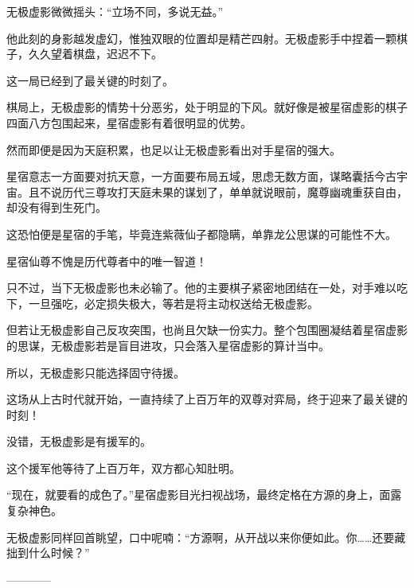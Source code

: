 \begin{this_body}
无极虚影微微摇头：“立场不同，多说无益。”

他此刻的身影越发虚幻，惟独双眼的位置却是精芒四射。无极虚影手中捏着一颗棋子，久久望着棋盘，迟迟不下。

这一局已经到了最关键的时刻了。

棋局上，无极虚影的情势十分恶劣，处于明显的下风。就好像是被星宿虚影的棋子四面八方包围起来，星宿虚影有着很明显的优势。

然而即便是因为天庭积累，也足以让无极虚影看出对手星宿的强大。

星宿意志一方面要对抗天意，一方面要布局五域，思虑无数方面，谋略囊括今古宇宙。且不说历代三尊攻打天庭未果的谋划了，单单就说眼前，魔尊幽魂重获自由，却没有得到生死门。

这恐怕便是星宿的手笔，毕竟连紫薇仙子都隐瞒，单靠龙公思谋的可能性不大。

星宿仙尊不愧是历代尊者中的唯一智道！

只不过，当下无极虚影也未必输了。他的主要棋子紧密地团结在一处，对手难以吃下，一旦强吃，必定损失极大，等若是将主动权送给无极虚影。

但若让无极虚影自己反攻突围，也尚且欠缺一份实力。整个包围圈凝结着星宿虚影的思谋，无极虚影若是盲目进攻，只会落入星宿虚影的算计当中。

所以，无极虚影只能选择固守待援。

这场从上古时代就开始，一直持续了上百万年的双尊对弈局，终于迎来了最关键的时刻！

没错，无极虚影是有援军的。

这个援军他等待了上百万年，双方都心知肚明。

“现在，就要看的成色了。”星宿虚影目光扫视战场，最终定格在方源的身上，面露复杂神色。

无极虚影同样回首眺望，口中呢喃：“方源啊，从开战以来你便如此。你……还要藏拙到什么时候？”

------------

\end{this_body}

